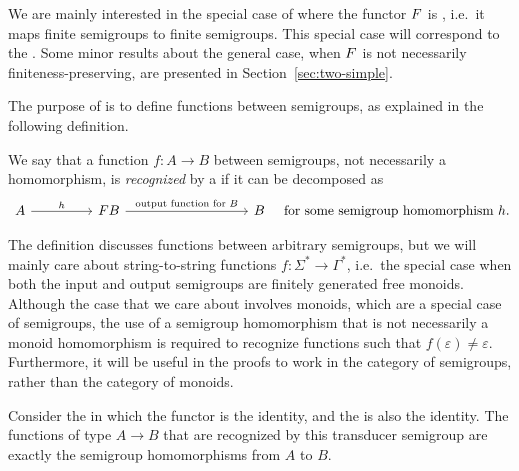 \AP We are mainly interested in the special case of  where the functor $\functor$ is , i.e.~it maps finite semigroups to finite semigroups. This special case will correspond to the . Some minor results about the general case, when $\functor$ is not necessarily finiteness-preserving, are presented in Section~\ref{sec:two-simple}.

The purpose of  is to define functions between semigroups, as explained in the following definition. 
\begin{definition}
 We say that a function $f\colon A \to B$ between semigroups, not necessarily a homomorphism, is \emph{recognized} by a  if it can be decomposed as
 \[
 \begin{tikzcd}
 [column sep=1.6cm]
 A 
 \ar[r,"h"]
 &
 \functor B
 \ar[rr,"\text{output function for $B$}"]
 &&
 B
 \end{tikzcd}
 \quad
 \text{for some semigroup homomorphism}\ h.
 \]
\end{definition}
The definition discusses functions between arbitrary semigroups, but we will
mainly care about string-to-string functions $f\colon \Sigma^* \to \Gamma^*$,
i.e.~the special case when both the input and output semigroups are finitely
generated free monoids. Although the case that we care about involves monoids,
which are a special case of semigroups, the use of a semigroup homomorphism that
is not necessarily a monoid homomorphism is required to recognize functions such
that $f(\varepsilon)\neq\varepsilon$. Furthermore, it will be useful in the
proofs to work in the category of semigroups, rather than the category of monoids.

\begin{example}
 Consider the  in which the functor is the identity, and the  is also the identity. The functions of type $A \to B$ that are recognized by this transducer semigroup are exactly the semigroup homomorphisms from $A$ to $B$.
\end{example}

